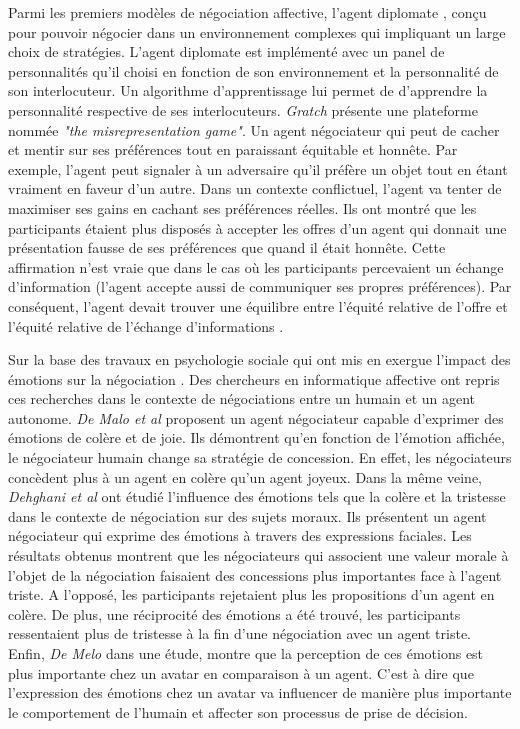 	 Parmi les premiers modèles de négociation affective, l'agent diplomate \cite{kraus1995designing}, conçu pour pouvoir négocier dans un environnement complexes qui impliquant un large choix de stratégies. L'agent diplomate est implémenté avec un panel de personnalités qu'il choisi en fonction de son environnement et la personnalité de son interlocuteur.  Un algorithme d'apprentissage lui permet de d'apprendre la personnalité respective de ses interlocuteurs. 
	 \emph{Gratch} \cite{gratch2016misrepresentation} présente une plateforme nommée \emph{"the misrepresentation game"}. Un agent négociateur qui peut de cacher et mentir sur ses préférences tout en paraissant équitable et honnête. Par exemple, l'agent peut signaler à un adversaire qu'il préfère un objet tout en étant vraiment en faveur d'un autre. Dans un contexte conflictuel, l'agent va tenter de maximiser ses gains en cachant ses préférences réelles. Ils ont montré que les participants étaient plus disposés à accepter les offres d'un agent qui donnait une présentation fausse de ses préférences que quand il était honnête. Cette affirmation n'est vraie que dans le cas où les participants percevaient un échange d'information (l'agent accepte aussi de communiquer ses propres préférences). Par conséquent, l'agent devait trouver une équilibre entre l'équité relative de l'offre et l'équité relative de l'échange d'informations \cite{gratch2016misrepresentation}.
	 
	 Sur la base des travaux en psychologie sociale qui ont mis en exergue l'impact des émotions sur la négociation \cite{van2006power}. Des chercheurs en informatique affective ont repris ces recherches dans le contexte de négociations entre un humain et un agent autonome. \emph{De Malo et al} \cite{de2011effect,de2015humans} proposent un agent négociateur capable d'exprimer des émotions de colère et de joie. Ils démontrent qu'en fonction de l'émotion affichée, le négociateur humain change sa stratégie de concession. En effet, les négociateurs concèdent plus à un agent en colère qu'un agent joyeux. Dans la même veine, \emph{Dehghani et al} \cite{dehghani2014interpersonal} ont étudié l'influence des émotions tels que la colère et la tristesse dans le contexte de négociation sur des sujets moraux. Ils présentent un agent négociateur qui exprime des émotions à travers des expressions faciales.
	 Les résultats obtenus montrent que les négociateurs qui associent une valeur morale à l'objet de la négociation faisaient des concessions plus importantes face à l'agent triste. A l'opposé, les participants rejetaient plus les propositions d'un agent en colère. De plus, une réciprocité des émotions a été trouvé, les participants ressentaient plus de tristesse à la fin d'une négociation avec un agent triste.  
	 Enfin, \emph{De Melo} \cite{de2015humans} dans une étude, montre que la perception de ces émotions est plus importante chez un avatar en comparaison à un agent. C'est à dire que l'expression des émotions chez un avatar va influencer de manière plus importante le comportement de l'humain et affecter son processus de prise de décision.  
	 
